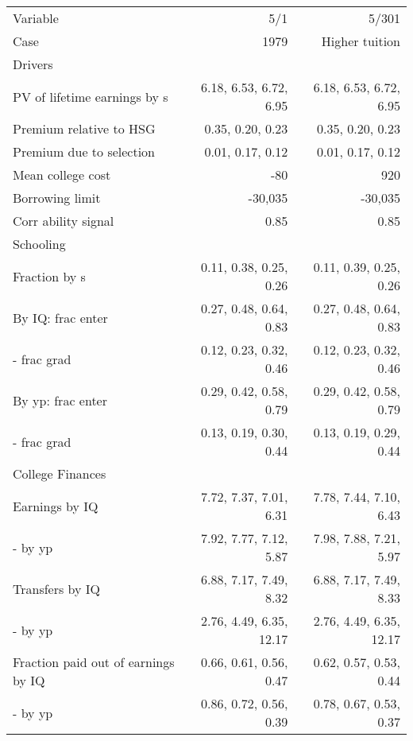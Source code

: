 \begin{tabular}{lrr}
\hline
Variable & 5/1  & 5/301  \\ 
Case & 1979  & Higher tuition  \\ 
Drivers &   &   \\ 
PV of lifetime earnings by s & 6.18, 6.53, 6.72, 6.95  & 6.18, 6.53, 6.72, 6.95  \\ 
Premium relative to HSG & 0.35, 0.20, 0.23  & 0.35, 0.20, 0.23  \\ 
Premium due to selection & 0.01, 0.17, 0.12  & 0.01, 0.17, 0.12  \\ 
Mean college cost & -80  & 920  \\ 
Borrowing limit & -30,035  & -30,035  \\ 
Corr ability signal & 0.85  & 0.85  \\ 
\hline
Schooling &   &   \\ 
Fraction by s & 0.11, 0.38, 0.25, 0.26  & 0.11, 0.39, 0.25, 0.26  \\ 
By IQ: frac enter & 0.27, 0.48, 0.64, 0.83  & 0.27, 0.48, 0.64, 0.83  \\ 
- frac grad & 0.12, 0.23, 0.32, 0.46  & 0.12, 0.23, 0.32, 0.46  \\ 
By yp: frac enter & 0.29, 0.42, 0.58, 0.79  & 0.29, 0.42, 0.58, 0.79  \\ 
- frac grad & 0.13, 0.19, 0.30, 0.44  & 0.13, 0.19, 0.29, 0.44  \\ 
\hline
College Finances &   &   \\ 
Earnings by IQ & 7.72, 7.37, 7.01, 6.31  & 7.78, 7.44, 7.10, 6.43  \\ 
- by yp & 7.92, 7.77, 7.12, 5.87  & 7.98, 7.88, 7.21, 5.97  \\ 
Transfers by IQ & 6.88, 7.17, 7.49, 8.32  & 6.88, 7.17, 7.49, 8.33  \\ 
- by yp & 2.76, 4.49, 6.35, 12.17  & 2.76, 4.49, 6.35, 12.17  \\ 
Fraction paid out of earnings by IQ & 0.66, 0.61, 0.56, 0.47  & 0.62, 0.57, 0.53, 0.44  \\ 
- by yp & 0.86, 0.72, 0.56, 0.39  & 0.78, 0.67, 0.53, 0.37  \\ 
\hline
\end{tabular}%
